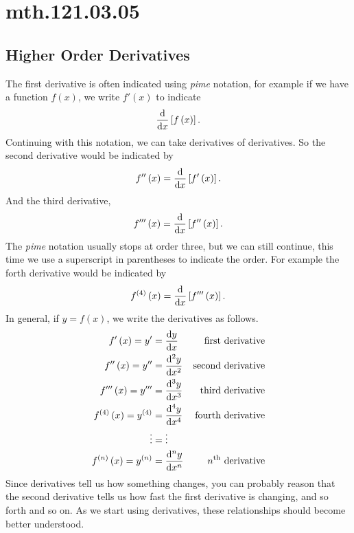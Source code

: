 \documentclass[12pt,addpoints, answers, fleqn]{exam}
\begin{document}
\section{mth.121.03.05}
\subsection{Higher Order Derivatives}


The first derivative is often indicated using \emph{pime} notation, for example if we have a function $f\left(x\right)$, we write $f'\left(x\right)$ to indicate
\[
\frac{{\rm{d}}}{{\rm{d}}x}\left[f\left(x\right)\right].
\]
Continuing with this notation, we can take derivatives of derivatives. So the second derivative would be indicated by
\[
f''\left(x\right) = \frac{{\rm{d}}}{{\rm{d}}x}\left[f'\left(x\right)\right].
\]
And the third derivative,
\[
f'''\left(x\right) = \frac{{\rm{d}}}{{\rm{d}}x}\left[f''\left(x\right)\right].
\]
The \emph{pime} notation usually stops at order three, but we can still continue,  this time we use a superscript in parentheses to indicate the order. For example the forth derivative would be indicated by
\[
f^{\left(4\right)}\left(x\right) = \frac{{\rm{d}}}{{\rm{d}}x}\left[f'''\left(x\right)\right].
\]
In general, if $y=f\left(x\right)$, we write the derivatives as follows.
\begin{align*}
f'\left( x \right)  = y' &= \frac{{\rm{d}}y}{{\rm{d}}x} & \text{first derivative}\\
f''\left( x \right) = y'' &= \frac{{\rm{d}}^2y}{{\rm{d}}x^2} & \text{second derivative}\\
f'''\left( x \right) = y''' &= \frac{{\rm{d}}^3y}{{\rm{d}}x^3} & \text{third derivative}\\
f^{\left(4\right)}\left( x \right) = y^{\left(4\right)}  &= \frac{{\rm{d}}^4y}{{\rm{d}}x^4} & \text{fourth derivative}\\
\vdots &= \vdots  & \\
f^{\left(n\right)}\left( x \right) = y^{\left(n\right)}&= \frac{{\rm{d}}^n y}{{\rm{d}}x^n} & \text{$n^{\rm{th}}$ derivative}
\end{align*}
Since derivatives tell us how something changes, you can probably reason that the second derivative tells us how fast the first derivative is changing, and so forth and so on. As we start using derivatives, these relationships should become better understood.
\end{document}
